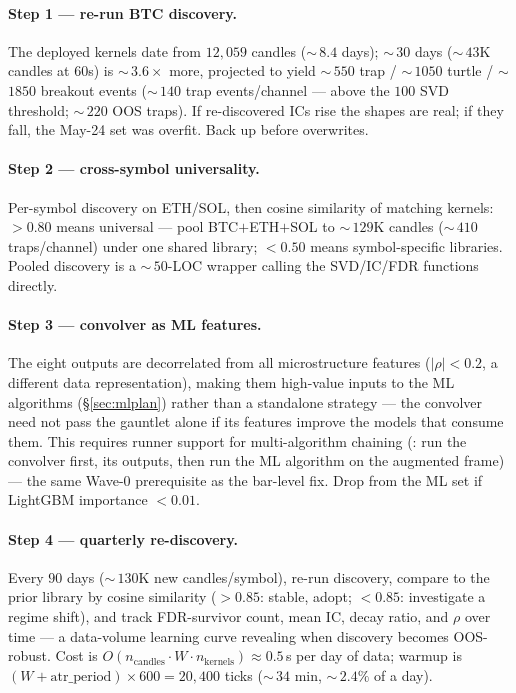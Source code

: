 \documentclass[11pt]{article}
\newcommand{\code}[1]{\texttt{\detokenize{#1}}}
\begin{document}
\paragraph{Step 1 --- re-run BTC discovery.} The deployed kernels date from $12{,}059$ candles
($\sim$\,$8.4$ days); $\sim$\,$30$ days ($\sim$\,$43$K candles at $60$s) is $\sim$\,$3.6\times$
more, projected to yield $\sim$\,$550$ trap / $\sim$\,$1050$ turtle / $\sim$\,$1850$ breakout
events ($\sim$\,$140$ trap events/channel --- above the $100$ SVD threshold; $\sim$\,$220$ OOS
traps). If re-discovered ICs rise the shapes are real; if they fall, the May-24 set was overfit.
Back up before \code{--save} overwrites.

\paragraph{Step 2 --- cross-symbol universality.} Per-symbol discovery on ETH/SOL, then cosine
similarity of matching kernels: $>0.80$ means universal --- pool BTC$+$ETH$+$SOL to
$\sim$\,$129$K candles ($\sim$\,$410$ traps/channel) under one shared library; $<0.50$ means
symbol-specific libraries. Pooled discovery is a $\sim$\,$50$-LOC wrapper calling the
SVD/IC/FDR functions directly.

\paragraph{Step 3 --- convolver as ML features.} The eight outputs are decorrelated from all
microstructure features ($|\rho|<0.2$, a different data representation), making them high-value
inputs to the ML algorithms (\S\ref{sec:mlplan}) rather than a standalone strategy --- the
convolver need not pass the gauntlet alone if its features improve the models that consume them.
This requires runner support for multi-algorithm chaining (\code{run_chain}: run the convolver
first, \code{concat} its outputs, then run the ML algorithm on the augmented frame) --- the same
Wave-0 prerequisite as the bar-level fix. Drop from the ML set if LightGBM importance $<0.01$.

\paragraph{Step 4 --- quarterly re-discovery.} Every $90$ days ($\sim$\,$130$K new
candles/symbol), re-run discovery, compare to the prior library by cosine similarity ($>0.85$:
stable, adopt; $<0.85$: investigate a regime shift), and track FDR-survivor count, mean IC,
decay ratio, and $\rho$ over time --- a data-volume learning curve revealing when discovery
becomes OOS-robust. Cost is
$O(n_{\text{candles}}\!\cdot\!W\!\cdot\!n_{\text{kernels}})\approx0.5$\,s per day of data;
warmup is $(W+\text{atr\_period})\times600=20{,}400$ ticks ($\sim$\,$34$ min, $\sim$\,$2.4\%$ of
a day).
\end{document}
